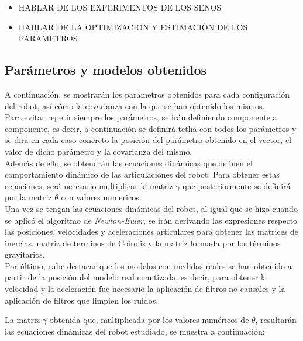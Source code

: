 	\begin{itemize}
		\item HABLAR DE LOS EXPERIMENTOS DE LOS SENOS
		\item HABLAR DE LA OPTIMIZACION Y ESTIMACIÓN DE LOS PARAMETROS
	\end{itemize}


	\subsection{Parámetros y modelos obtenidos}
	A continuación, se mostrarán los parámetros obtenidos para cada configuración del robot, así cómo la covarianza con la que se han obtenido los mismos.\\
	Para evitar repetir siempre los parámetros, se irán definiendo componente a componente, es decir, a continuación se definirá tetha con todos los parámetros y se dirá en cada caso concreto la posición del parámetro obtenido en el vector, el valor de dicho parámetro y la covarianza del mismo. \\

	Además de ello, se obtendrán las ecuaciones dinámicas que definen el comportamiento dinámico de las articulaciones del robot. Para obtener éstas ecuaciones, será necesario multiplicar la matriz $\gamma$ que posteriormente se definirá por la matriz $\theta$ con valores numericos. \\
	Una vez se tengan las ecuaciones dinámicas del robot, al igual que se hizo cuando se aplicó el algoritmo de \textit{Newton-Euler}, se irán derivando las expresiones respecto las posiciones, velocidades y aceleraciones articulares para obtener las matrices de inercias, matriz de terminos de Coirolis y la matriz formada por los términos gravitarios.\\

	Por último, cabe destacar que los modelos con medidas reales se han obtenido a partir de la posición del modelo real cuantizada, es decir, para obtener la velocidad y la aceleración fue necesario la aplicación de filtros no causales y la aplicación de filtros que limpien los ruidos.


La matriz $\gamma$ obtenida que, multiplicada por los valores numéricos de $\theta$, resultarán las ecuaciones dinámicas del robot estudiado, se muestra a continuación:



